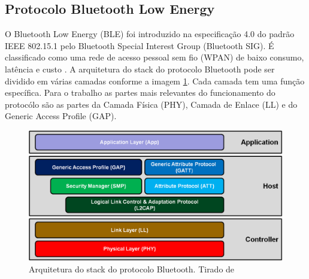\subsection{Protocolo Bluetooth Low Energy}

O Bluetooth Low Energy (BLE) foi introduzido na especificação 4.0 do padrão IEEE 802.15.1 pelo Bluetooth Special Interest Group (Bluetooth SIG). É classificado como uma rede de acesso pessoal sem fio (WPAN) de baixo consumo, latência e custo \cite{Bluetooth_SIG_Site}.
A arquitetura do stack do protocolo Bluetooth pode ser dividido em várias camadas conforme a imagem \ref{fig:ble-protocol-stack.png}. Cada camada tem uma função específica. Para o trabalho as partes mais relevantes do funcionamento do protocólo são as partes da Camada Física (PHY), Camada de Enlace (LL) e do Generic Access Profile (GAP).

\begin{figure}[H]
    \centering
    \includegraphics[width=1.0\textwidth]{images/ble-protocol-stack.png}
    \caption{Arquitetura do stack do protocolo Bluetooth. Tirado de \cite{Microchip_Site} }
    \label{fig:ble-protocol-stack.png}
\end{figure}



